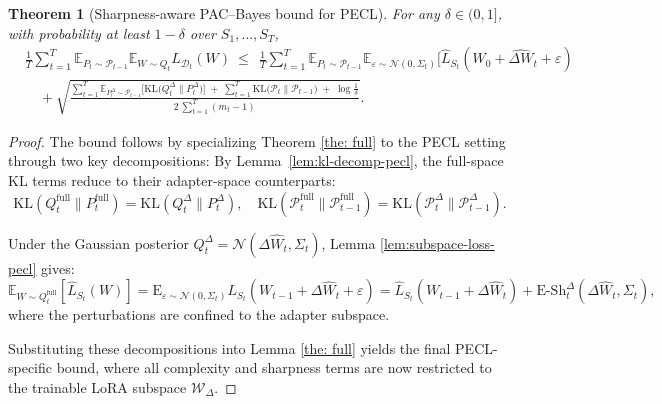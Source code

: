 \documentclass{article}
\theoremstyle{plain}
\newtheorem{theorem}{Theorem}[section]
\theoremstyle{definition}
\theoremstyle{remark}
\begin{document}
\begin{theorem}[Sharpness-aware PAC--Bayes bound for PECL]

For any $\delta\in(0,1]$, with probability at least $1-\delta$ over $S_1,\ldots,S_T$,
\begin{equation}\label{eq:pecl-main}
\begin{aligned}
&\frac{1}{T}\sum_{t=1}^T
\mathbb{E}_{P_t\sim\mathcal P_{t-1}}\mathbb{E}_{W\sim Q_t}L_{\mathcal{D}_t}(W)
\ \le\
\ \frac{1}{T}\sum_{t=1}^T
\mathbb{E}_{P_t\sim\mathcal P_{t-1}}
\mathbb{E}_{\varepsilon \sim \mathcal{N}(0, \Sigma_t)}[\hat{L}_{S_t}(W_0 + \hat{\Delta W}_t + \varepsilon)
\\
&\quad +\sqrt{\frac{
\displaystyle \sum_{t=1}^T \mathbb{E}_{P_t^\Delta\sim\mathcal P_{t-1}}\!\Big[\mathrm{KL}\!\big(Q_t^\Delta\|P_t^\Delta\big)\Big]
\;+\;\displaystyle \sum_{t=1}^T \mathrm{KL}\!\big(\mathcal P_t\|\mathcal P_{t-1}\big)
\;+\;\log\!\frac{1}{\delta}
}{2\,\displaystyle\sum_{t=1}^T (m_t-1)}}.
\end{aligned}
\end{equation}
\end{theorem}



\begin{proof}
The bound follows by specializing Theorem \ref{the: full} to the PECL setting through two key decompositions:
By Lemma~\ref{lem:kl-decomp-pecl}, the full-space KL terms reduce to their adapter-space counterparts:
\[
\mathrm{KL}(Q_t^{\mathrm{full}} \| P_t^{\mathrm{full}}) = \mathrm{KL}(Q_t^\Delta \| P_t^\Delta),
\quad
\mathrm{KL}(\mathcal{P}_t^{\mathrm{full}} \| \mathcal{P}_{t-1}^{\mathrm{full}}) = \mathrm{KL}(\mathcal{P}_t^\Delta \| \mathcal{P}_{t-1}^\Delta).
\]

Under the Gaussian posterior $Q_t^\Delta = \mathcal{N}(\Delta\hat{W}_t, \Sigma_t)$, Lemma \ref{lem:subspace-loss-pecl} gives:
\[
\mathbb{E}_{W \sim Q_t^{\mathrm{full}}}[\hat{L}_{S_t}(W)] 
= \mathrm{E}_{\varepsilon \sim \mathcal{N}(0, \Sigma_t)}{L}_{S_t}(W_{t-1}+\Delta\hat{W}_t + \varepsilon)
 = \hat{L}_{S_t}(W_{t-1} + \Delta\hat{W}_t) + \mathrm{E\text{-}Sh}_t^\Delta(\Delta\hat{W}_t, \Sigma_t),
\]
where the perturbations are confined to the adapter subspace.

Substituting these decompositions into Lemma \ref{the: full} yields the final PECL-specific bound, where all complexity and sharpness terms are now restricted to the trainable LoRA subspace $\mathcal{W}_\Delta$.

\end{proof}
\end{document}
